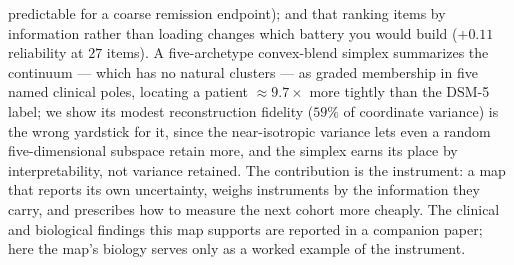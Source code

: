 predictable for a coarse remission endpoint); and that ranking items by information
rather than loading changes which battery you would build ($+0.11$ reliability at
$27$ items). A five-archetype convex-blend simplex
summarizes the continuum --- which has no natural clusters --- as graded membership
in five named clinical poles, locating a patient $\approx 9.7\times$ more tightly
than the DSM-5 label; we show its modest reconstruction fidelity ($59\%$ of
coordinate variance) is the wrong yardstick for it, since the near-isotropic
variance lets even a random five-dimensional subspace retain more, and the simplex
earns its place by interpretability, not variance retained. The contribution is the
instrument: a map that reports its own uncertainty, weighs instruments by the
information they carry, and prescribes how to measure the next cohort more
cheaply. The clinical and biological findings this map supports are reported in
a companion paper; here the map's biology serves only as a worked example of the
instrument.
